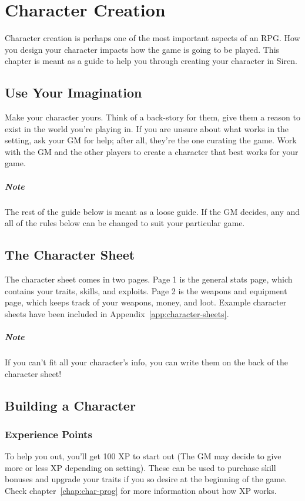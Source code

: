 \chapter{Character Creation}
Character creation is perhaps one of the most important aspects of an RPG.
How you design your character impacts how the game is going to be played.
This chapter is meant as a guide to help you through creating your character in Siren.

\section{Use Your Imagination}
Make your character yours.
Think of a back-story for them, give them a reason to exist in the world you're playing in.
If you are unsure about what works in the setting, ask your GM for help; after all, they're the one curating the game.
Work with the GM and the other players to create a character that best works for your game.

\paragraph{Note} The rest of the guide below is meant as a loose guide.
If the GM decides, any and all of the rules below can be changed to suit your particular game.

\section{The Character Sheet}
The character sheet comes in two pages.
Page 1 is the general stats page, which contains your traits, skills, and exploits.
Page 2 is the weapons and equipment page, which keeps track of your weapons, money, and loot.
Example character sheets have been included in Appendix~\ref{app:character-sheets}.

\paragraph{Note} If you can't fit all your character's info, you can write them on the back of the character sheet!

\section{Building a Character}
\subsection{Experience Points}
To help you out, you'll get 100 XP to start out (The GM may decide to give more or less XP depending on setting).
These can be used to purchase skill bonuses and upgrade your traits if you so desire at the beginning of the game.
Check chapter~\ref{chap:char-prog} for more information about how XP works.

